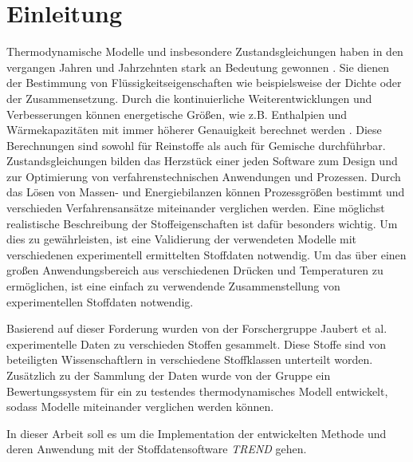 \documentclass[../thesis.tex]{subfiles}
\begin{document}
\chapter{Einleitung}
\label{chp:Motivation}
Thermodynamische Modelle und insbesondere Zustandsgleichungen haben in den vergangen Jahren und Jahrzehnten stark an Bedeutung gewonnen \cite{ahlers2002development, stacey2000k}. Sie dienen der Bestimmung von Flüssigkeitseigenschaften wie beispielsweise der Dichte oder der Zusammensetzung. Durch die kontinuierliche Weiterentwicklungen und Verbesserungen können energetische Größen, wie z.B. Enthalpien und Wärmekapazitäten mit immer höherer Genauigkeit berechnet werden \cite{chen2002modification}. Diese Berechnungen sind sowohl für Reinstoffe als auch für Gemische durchführbar.
Zustandsgleichungen bilden das Herzstück einer jeden Software zum Design und zur Optimierung von verfahrenstechnischen Anwendungen und Prozessen. Durch das Lösen von Massen- und Energiebilanzen können Prozessgrößen bestimmt und verschieden Verfahrensansätze miteinander verglichen werden. Eine möglichst realistische Beschreibung der Stoffeigenschaften ist dafür besonders wichtig. Um dies zu gewährleisten, ist eine Validierung der verwendeten Modelle mit verschiedenen experimentell ermittelten Stoffdaten notwendig. Um das über einen großen Anwendungsbereich aus verschiedenen Drücken und Temperaturen zu ermöglichen, ist eine einfach zu verwendende Zusammenstellung von experimentellen Stoffdaten notwendig.

Basierend auf dieser Forderung wurden von der Forschergruppe Jaubert et al. \cite{jaubert2020benchmark} experimentelle Daten zu verschieden Stoffen gesammelt. Diese Stoffe sind von beteiligten Wissenschaftlern in verschiedene Stoffklassen unterteilt worden. Zusätzlich zu der Sammlung der Daten wurde von der Gruppe ein Bewertungssystem für ein zu testendes thermodynamisches Modell entwickelt, sodass Modelle miteinander verglichen werden können.

In dieser Arbeit soll es um die Implementation der entwickelten Methode und deren Anwendung mit der Stoffdatensoftware \textit{TREND} gehen.
\end{document}
